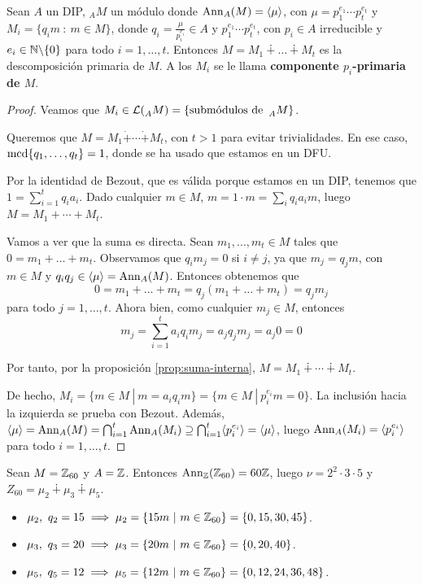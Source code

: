\begin{prop}
  Sean \(A\) un DIP, \({}_AM\) un módulo donde \(\operatorname{Ann}_A(M) = \langle\mu\rangle\), con
  \(\mu = p_1^{e_1}\cdots p_t^{e_t}\) y \(M_i = \{q_im \ : \ m \in M\}\), donde
  \(q_i = \frac{\mu}{p_i^{e_i}} \in A\) y \(p_1^{e_1}\cdots p_t^{e_t}\), con \(p_i\in A\)
  irreducible y \(e_i \in \mathbb{N}\backslash\{0\}\) para todo \(i = 1, \ldots, t\).
  Entonces
  \(M = M_1 \dotplus \ldots \dotplus M_t\) es la descomposición primaria de \(M\). A los
  \(M_i\) se le llama \textbf{componente \(p_i\)-primaria de \(M\)}.
\end{prop}
\begin{proof}
  Veamos que \(M_i\in\mathcal{L}(\prescript{}{A}{M})=\{\textrm{submódulos
    de } \prescript{}{A}{M}\}\).

  Queremos que \(M=M_1\dot{+}\cdots \dot{+}M_t\), con \(t>1\) para
  evitar trivialidades. En ese caso, \(\operatorname{mcd}\{q_1,\ldots,q_t\} = 1\),
  donde se ha usado que estamos en un DFU.

  Por la identidad de Bezout, que es válida porque estamos en un DIP,
  tenemos que \(1=\sum_{i=1}^t q_i a_i\). Dado cualquier \(m \in M\),
  \(m = 1 \cdot m = \sum_i q_i a_i m\), luego \(M = M_1+ \cdots + M_t\).

  Vamos a ver que la suma es directa.
  Sean \(m_1, \ldots, m_t \in M\) tales que \(0 = m_1 + \ldots + m_t\). Observamos que
  \(q_im_j = 0\) si \(i \neq j\), ya que \(m_j = q_jm\), con \(m \in M\) y
  \(q_iq_j \in \langle \mu \rangle = \operatorname{Ann}_A(M)\). Entonces obtenemos que
  \[
    0 = m_1 + \ldots + m_t = q_j(m_1 + \ldots + m_t) = q_jm_j
  \]
  para todo \(j = 1, \ldots, t\). Ahora bien, como cualquier \(m_j \in M\), entonces
  \[
    m_j = \sum_{i=1}^{t}a_iq_im_j = a_jq_jm_j = a_j0 = 0
  \]
  
  Por tanto, por la proposición \ref{prop:suma-interna}, \(M=M_1\dotplus \cdots \dotplus
  M_t\).

  De hecho, \(M_i = \{m \in M \ | \ m = a_iq_im\} = \{m \in M \ | \ p_i^{e_i}m = 0\}\). La
  inclusión hacia la izquierda se prueba con Bezout.
  Además, \(\langle \mu \rangle = \operatorname{Ann}_A(M) = \bigcap_{i=1}^{t}\operatorname{Ann}_A(M_i)
  \supseteq \bigcap_{i=1}^{t} \langle p_i^{e_i}\rangle = \langle \mu \rangle\),
  luego \(\operatorname{Ann}_A(M_i) = \langle p_i^{e_i} \rangle\) para todo \(i=1, \ldots, t\).
\end{proof}

\begin{ejemplo}
  Sean \( M = \mathbb{Z}_{60}\) y \(A = \mathbb{Z}\). Entonces \(\operatorname{Ann}_{\mathbb{Z}}(\mathbb{Z}_{60}) = 60\mathbb{Z}\),
  luego \(\nu = 2^2 \cdot 3 \cdot 5\) y \(Z_{60} = \mu_2 \dotplus
  \mu_3 \dotplus \mu_5\).
  \begin{itemize}
  \item \(\mu_2, \ q_2 = 15 \implies \mu_2 = \{15m \ | \ m \in \mathbb{Z}_{60}\} =
    \{0, 15, 30, 45\}\).
  \item \(\mu_3, \ q_3 = 20 \implies \mu_3 = \{20m \ | \ m \in \mathbb{Z}_{60}\} = \{0, 20, 40\}\).
  \item \(\mu_5, \ q_5 = 12 \implies \mu_5 = \{12m \ | \ m \in \mathbb{Z}_{60}\} = \{0, 12, 24, 36,
    48\}\).
  \end{itemize}
\end{ejemplo}

